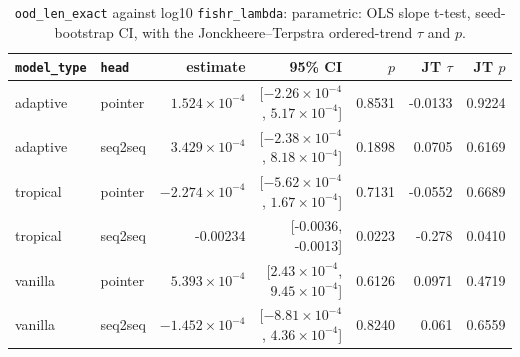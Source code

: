 \documentclass[10pt]{article}
\begin{document}
{\small
\begin{longtable}{llrrrrr}
\caption{\texttt{ood\_len\_exact} against log10 \texttt{fishr\_lambda}: parametric: OLS slope t-test, seed-bootstrap CI, with the Jonckheere--Terpstra ordered-trend $\tau$ and $p$.}\label{tab:trend-ood_len_exact}\\
\toprule
\texttt{model\_type} & \texttt{head} & estimate & 95\% CI & $p$ & JT $\tau$ & JT $p$\\
\midrule
\endhead
adaptive & pointer & $1.524\times10^{-4}$ & [$-2.26\times10^{-4}$, $5.17\times10^{-4}$] & 0.8531 & -0.0133 & 0.9224\\
adaptive & seq2seq & $3.429\times10^{-4}$ & [$-2.38\times10^{-4}$, $8.18\times10^{-4}$] & 0.1898 & 0.0705 & 0.6169\\
tropical & pointer & $-2.274\times10^{-4}$ & [$-5.62\times10^{-4}$, $1.67\times10^{-4}$] & 0.7131 & -0.0552 & 0.6689\\
tropical & seq2seq & -0.00234 & [-0.0036, -0.0013] & 0.0223 & -0.278 & 0.0410\\
vanilla & pointer & $5.393\times10^{-4}$ & [$2.43\times10^{-4}$, $9.45\times10^{-4}$] & 0.6126 & 0.0971 & 0.4719\\
vanilla & seq2seq & $-1.452\times10^{-4}$ & [$-8.81\times10^{-4}$, $4.36\times10^{-4}$] & 0.8240 & 0.061 & 0.6559\\
\bottomrule
\end{longtable}
}
\end{document}
